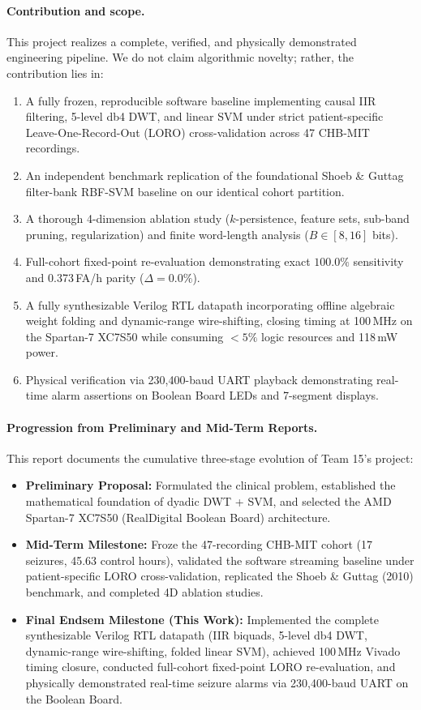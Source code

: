 \documentclass[10pt,twocolumn,letterpaper]{article}
\begin{document}
\paragraph{Contribution and scope.} This project realizes a complete, verified, and physically demonstrated engineering pipeline. We do not claim algorithmic novelty; rather, the contribution lies in:
\begin{enumerate}
    \item A fully frozen, reproducible software baseline implementing causal IIR filtering, 5-level db4 DWT, and linear SVM under strict patient-specific Leave-One-Record-Out (LORO) cross-validation across 47 CHB-MIT recordings.
    \item An independent benchmark replication of the foundational Shoeb \& Guttag \cite{shoeb2010icml} filter-bank RBF-SVM baseline on our identical cohort partition.
    \item A thorough 4-dimension ablation study ($k$-persistence, feature sets, sub-band pruning, regularization) and finite word-length analysis ($B \in [8, 16]$ bits).
    \item Full-cohort fixed-point re-evaluation demonstrating exact $100.0\%$ sensitivity and 0.373\,FA/h parity ($\Delta = 0.0\%$).
    \item A fully synthesizable Verilog RTL datapath incorporating offline algebraic weight folding and dynamic-range wire-shifting, closing timing at 100\,MHz on the Spartan-7 XC7S50 while consuming $<5\%$ logic resources and 118\,mW power.
    \item Physical verification via 230,400-baud UART playback demonstrating real-time alarm assertions on Boolean Board LEDs and 7-segment displays.
\end{enumerate}

{\color{blue}
\paragraph{Progression from Preliminary and Mid-Term Reports.}
This report documents the cumulative three-stage evolution of Team 15's project:
\begin{itemize}
    \item \textbf{Preliminary Proposal:} Formulated the clinical problem, established the mathematical foundation of dyadic DWT + SVM, and selected the AMD Spartan-7 XC7S50 (RealDigital Boolean Board) architecture.
    \item \textbf{Mid-Term Milestone:} Froze the 47-recording CHB-MIT cohort (17 seizures, 45.63 control hours), validated the software streaming baseline under patient-specific LORO cross-validation, replicated the Shoeb \& Guttag (2010) benchmark, and completed 4D ablation studies.
    \item \textbf{Final Endsem Milestone (This Work):} Implemented the complete synthesizable Verilog RTL datapath (IIR biquads, 5-level db4 DWT, dynamic-range wire-shifting, folded linear SVM), achieved 100\,MHz Vivado timing closure, conducted full-cohort fixed-point LORO re-evaluation, and physically demonstrated real-time seizure alarms via 230,400-baud UART on the Boolean Board.
\end{itemize}
}
\end{document}
